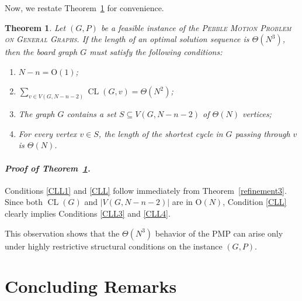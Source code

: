 \documentclass[letter,11pt]{article}
\newtheorem{thm}{Theorem}
\newcommand{\white}{\qquad{\framebox{\rule{0pt}{4pt}}}}
\newcommand{\owari}{\hfill\white}
\theoremstyle{definition}
\theoremstyle{definition}
\DeclareMathOperator{\CL}{CL}
\newcommand{\1}{\boldmath$~1~$\unboldmath}
\newcommand{\Ord}{\mathrm{O}}
\newcommand{\qedgo}{\vspace{0.35cm}}
\newenvironment{Proofof}[1]{\expandafter
\paragraph{{\it Proof of #1.}}}{\hspace{5mm}\owari\qedgo}
\begin{document}
Now, we restate Theorem~\ref{Restriction} for convenience.
{\setcounter{thm}{5}
\begin{thm}\label{Restriction}
Let $(G,P)$ be a feasible instance of the \textsc{Pebble Motion Problem on General Graphs}.
If the length of an optimal solution sequence is $\Theta(N^3)$, then the board graph $G$ must satisfy 
the following conditions:
\begin{enumerate}
\item $N-n = \Ord(1)$;\label{CLL1}
\item $\displaystyle \sum_{v\in V(G,N-n-2)} \CL(G,v) = \Theta(N^2)$;\label{CLL}
\item The graph $G$ contains a set $S \subseteq V(G,N-n-2)$ of $\Theta(N)$ vertices;\label{CLL3}
\item For every vertex $v \in S$, the length of the shortest cycle in $G$ passing through $v$ is $\Theta(N)$.\label{CLL4}
\end{enumerate}
\end{thm}}
\begin{Proofof}{Theorem~\ref{Restriction}}
Conditions \ref{CLL1} and \ref{CLL} follow immediately from Theorem~\ref{refinement3}.
Since both $\CL(G)$ and $|V(G,N-n-2)|$ are in $\Ord(N)$, Condition \ref{CLL} clearly implies Conditions \ref{CLL3} and \ref{CLL4}. 
\end{Proofof}

\noindent
This observation shows that the $\Theta(N^3)$ behavior of the PMP
can arise only under highly restrictive structural conditions on the instance $(G,P)$.
%
%



\section{Concluding Remarks}\label{final}
\end{document}
